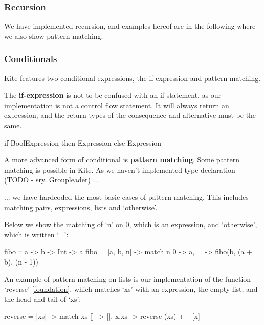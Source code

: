 \subsubsection{Recursion}

We have implemented recursion, and examples hereof are in the following where we also show pattern matching.

\subsubsection{Conditionals}

Kite features two conditional expressions, the if-expression and pattern matching.



The \textbf{if-expression} is not to be confused with an if-statement, as our implementation is not a control flow statement. It will always return an expression, and the return-types of the consequence and alternative must be the same.


\begin{kite}
  
  if BoolExpression then Expression else Expression
\end{kite}


A more advanced form of conditional is \textbf{pattern matching}. Some pattern matching is possible in Kite. As we haven't implemented type declaration (TODO - sry, Groupleader) ...

... we have hardcoded the most basic cases of pattern matching. This includes matching pairs, expressions, lists and `otherwise'.


Below we show the matching of `n' on 0, which is an expression, and `otherwise', which is written `\_':
\begin{kite}

fibo :: a -> b -> Int -> a
fibo = |a, b, n| -> {
    match n {
    0 -> a,
    _ -> fibo(b, (a + b), (n - 1))
    }
}
\end{kite}

An example of pattern matching on lists is our implementation of the function `reverse' \ref{foundation}, which matches `xs' with an expression, the empty list, and the head and tail of `xs':

\begin{kite}

reverse = |xs| -> {
  match xs {
    []    -> [],
    x,xs  -> reverse (xs) ++ [x]
  }
}

\end{kite}

